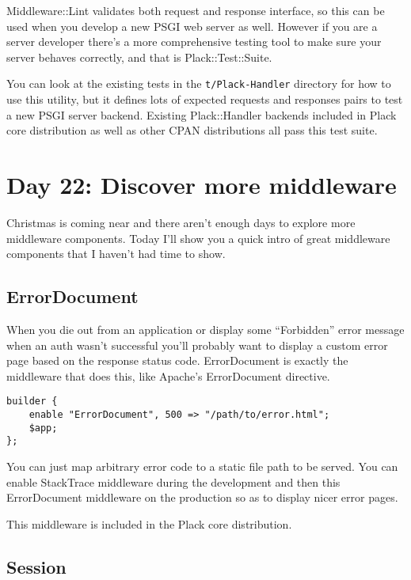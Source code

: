 Middleware::Lint validates both request and response interface, so this
can be used when you develop a new PSGI web server as well. However if
you are a server developer there's a more comprehensive testing tool to
make sure your server behaves correctly, and that is Plack::Test::Suite.

You can look at the existing tests in the \lstinline!t/Plack-Handler!
directory for how to use this utility, but it defines lots of expected
requests and responses pairs to test a new PSGI server backend. Existing
Plack::Handler backends included in Plack core distribution as well as
other CPAN distributions all pass this test suite.

\section{Day 22: Discover more
middleware}\label{day-22-discover-more-middleware}

Christmas is coming near and there aren't enough days to explore more
middleware components. Today I'll show you a quick intro of great
middleware components that I haven't had time to show.

\subsection{ErrorDocument}\label{errordocument}

When you die out from an application or display some ``Forbidden'' error
message when an auth wasn't successful you'll probably want to display a
custom error page based on the response status code. ErrorDocument is
exactly the middleware that does this, like Apache's ErrorDocument
directive.

\begin{lstlisting}
builder {
    enable "ErrorDocument", 500 => "/path/to/error.html";
    $app;
};
\end{lstlisting}

You can just map arbitrary error code to a static file path to be
served. You can enable StackTrace middleware during the development and
then this ErrorDocument middleware on the production so as to display
nicer error pages.

This middleware is included in the Plack core distribution.

\subsection{Session}\label{session}

